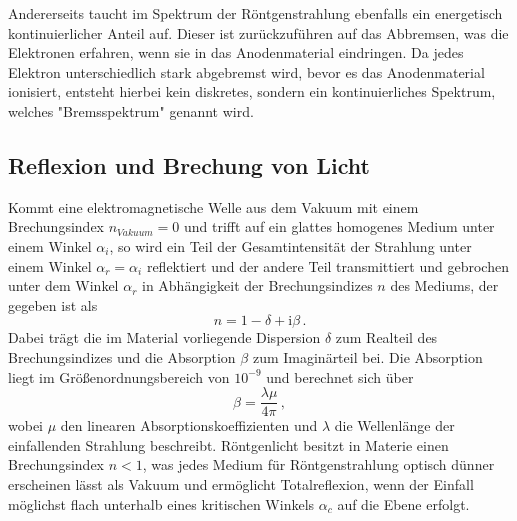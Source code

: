        Andererseits taucht im Spektrum der Röntgenstrahlung ebenfalls ein energetisch kontinuierlicher Anteil auf.
        Dieser ist zurückzuführen auf das Abbremsen, was die Elektronen erfahren, wenn sie in das Anodenmaterial eindringen.
        Da jedes Elektron unterschiedlich stark abgebremst wird, bevor es das Anodenmaterial ionisiert,
        entsteht hierbei kein diskretes, sondern ein kontinuierliches Spektrum, welches "Bremsspektrum" genannt wird.
    \subsection{Reflexion und Brechung von Licht}
        Kommt eine elektromagnetische Welle aus dem Vakuum mit einem Brechungsindex $n_{Vakuum}=0$ und trifft auf ein glattes homogenes Medium unter einem Winkel $\alpha_i$,
        so wird ein Teil der Gesamtintensität der Strahlung unter einem Winkel $\alpha_r=\alpha_i$ reflektiert und
        der andere Teil transmittiert und gebrochen unter dem Winkel $\alpha_r$ in Abhängigkeit der Brechungsindizes $n$
        des Mediums, der gegeben ist als
        \begin{equation}
            n=1-\delta + \text{i}\beta \, .
        \end{equation}
        Dabei trägt die im Material vorliegende Dispersion $\delta$ zum Realteil des Brechungsindizes und die Absorption $\beta$ zum Imaginärteil bei.
        Die Absorption liegt im Größenordnungsbereich von $10^{-9}$ und berechnet sich über
        \begin{equation}
            \beta = \frac{\lambda\mu}{4\pi} \, ,
            \label{eqn:beta}
        \end{equation}
        wobei $\mu$ den linearen Absorptionskoeffizienten und $\lambda$ die Wellenlänge der einfallenden Strahlung beschreibt.
        Röntgenlicht besitzt in Materie einen Brechungsindex $n<1$, was jedes Medium für Röntgenstrahlung optisch dünner erscheinen lässt als Vakuum
        und ermöglicht Totalreflexion, wenn der Einfall möglichst flach unterhalb eines kritischen Winkels $\alpha_c$ auf die Ebene erfolgt.

